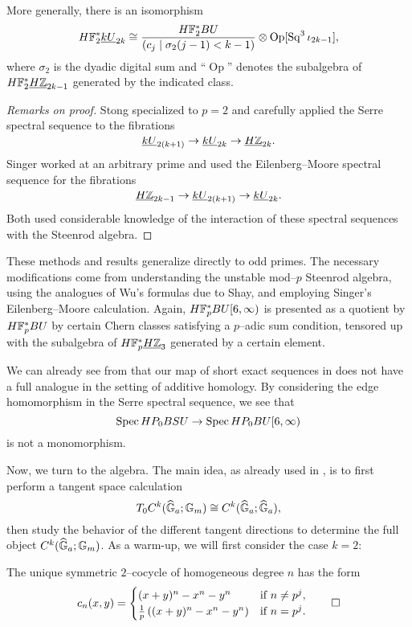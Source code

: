 \begin{theorem}
More generally, there is an isomorphism \[H\mathbb F_2^* \underline{\smash{kU}}_{2k} \cong \frac{H\mathbb F_2^* BU}{(c_j \mid \sigma_2(j - 1) < k - 1)} \otimes \operatorname{Op}[\operatorname{Sq}^3 \iota_{2k-1}],\] where $\sigma_2$ is the dyadic digital sum and ``$\operatorname{Op}$'' denotes the subalgebra of $H\mathbb F_2^* \underline{\smash{H\mathbb Z}}_{2k-1}$ generated by the indicated class.
\end{theorem}
\begin{proof}[Remarks on proof]
Stong specialized to $p = 2$ and carefully applied the Serre spectral sequence to the fibrations \[\underline{\smash{kU}}_{2(k+1)} \to \underline{\smash{kU}}_{2k} \to \underline{\smash{H\mathbb Z}}_{2k}.\]  Singer worked at an arbitrary prime and used the Eilenberg--Moore spectral sequence for the fibrations \[\underline{\smash{H\mathbb Z}}_{2k-1} \to \underline{\smash{kU}}_{2(k+1)} \to \underline{\smash{kU}}_{2k}.\]  Both used considerable knowledge of the interaction of these spectral sequences with the Steenrod algebra.
\end{proof}

\begin{remark}
These methods and results generalize directly to odd primes.  The necessary modifications come from understanding the unstable mod--$p$ Steenrod algebra, using the analogues of Wu's formulas due to Shay, and employing Singer's Eilenberg--Moore calculation.  Again, $H\mathbb F_p^* BU[6, \infty)$ is presented as a quotient by $H\mathbb F_p^* BU$ by certain Chern classes satisfying a $p$--adic sum condition, tensored up with the subalgebra of $H\mathbb F_p^* \underline{\smash{H\mathbb Z}}_{3}$ generated by a certain element.
\end{remark}

\begin{remark}
We can already see from  that our map of short exact sequences in  does not have a full analogue in the setting of additive homology.  By considering the edge homomorphism in the Serre spectral sequence, we see that \[\operatorname{Spec} HP_0 BSU \to \operatorname{Spec} HP_0 BU[6, \infty)\] is not a monomorphism.
\end{remark}





Now, we turn to the algebra.  The main idea, as already used in , is to first perform a tangent space calculation \[T_0 C^k(\widehat{\mathbb G}_a; \mathbb G_m) \cong C^k(\widehat{\mathbb G}_a; \widehat{\mathbb G}_a),\] then study the behavior of the different tangent directions to determine the full object $C^k(\widehat{\mathbb G}_a; \mathbb G_m)$.  As a warm-up, we will first consider the case $k = 2$:
\begin{corollary}
The unique symmetric $2$--cocycle of homogeneous degree $n$ has the form \[c_n(x, y) = \begin{cases} (x + y)^n - x^n - y^n & \text{if $n \ne p^j$}, \\ \frac{1}{p} \left( (x + y)^n - x^n - y^n \right) & \text{if $n = p^j$}. \end{cases} \qed\]
\end{corollary}

